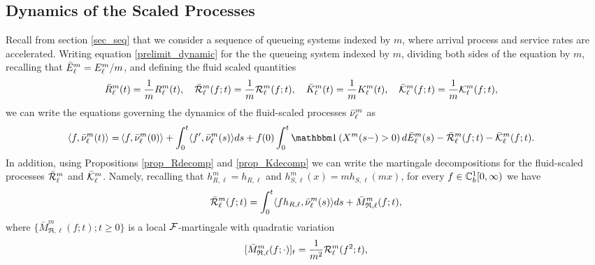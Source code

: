 \documentclass{article}
\theoremstyle{definition}
\numberwithin{equation}{section}
\begin{document}
\subsection{Dynamics of the Scaled Processes}\label{sec_mDynamic}
Recall from section \ref{sec_seq} that we consider a sequence of queueing systems indexed by $m$, where arrival process and service rates are accelerated. Writing equation  \eqref{prelimit_dynamic} for the the queueing system indexed by $m$, dividing both sides of the equation by $m$, recalling that $\bar E_\ell^m =E_\ell^m/m$, and defining the fluid scaled quantities
\begin{equation}\label{def_fluid}
  \bar{R}_\ell^m(t)=\frac{1}{m}R_\ell^m(t),\quad
  \bar{\mathcal{R}}_\ell^m(f;t)=\frac{1}{m}\mathcal{R}_\ell^m(f;t),\quad \bar{K}_\ell^m(t)=\frac{1}{m}K_\ell^m(t),\quad \bar{\mathcal{K}}_\ell^m(f;t)=\frac{1}{m}\mathcal{K}_\ell^m(f;t),\quad
\end{equation}
we can write the equations governing the dynamics of the fluid-scaled processes $\bar{\nu}_\ell^m$ as
\begin{align}\label{prelimit_dynamic_scaled}
  \pairil{f}{\bnu^m_\ell(t)}= & \pair{f}{\bnu^m_\ell(0)}+ \int_{0}^{t}\pairil{f'}{\bnu^m_\ell(s)}ds+   f(0)\int_0^t\indic{X^m(s-)>0}d\barrival^m_{\ell}(s)  -\bar\renegC^m_\ell(f;t)-\bar\entryC^m_\ell(f;t).
\end{align}
In addition, using Propositions \ref{prop_Rdecomp} and \ref{prop_Kdecomp} we can write the martingale decompositions for the fluid-scaled processes $\bar{\mathcal{R}}_\ell^m$ and $\bar{\mathcal{K}}_\ell^m$. Namely, recalling that $h^m_{R,\ell}=h_{R,\ell}$ and $h^m_{S,\ell}(x)=mh_{S,\ell}(mx)$, for every $f\in\mathbb{C}_b^{1}[0,\infty)$ we have
\begin{equation}\label{Rdecomp_scaled}
    \bar{\mathcal{R}}^m_\ell(f;t)= \int_0^t \langle fh_{R,\ell},\bar{\nu}^m_\ell(s)\rangle ds +\bar M^m_{\mathfrak{R},\ell}(f;t),
\end{equation}
where $\{\bar M^m_{\mathfrak{R},\ell}(f;t);t\geq0\}$ is a local $\mathcal{F}$-martingale with quadratic variation
\begin{equation}\label{MR_QV}
  [\bar M^m_{\mathfrak{R},\ell}(f;\cdot)]_t =\frac{1}{m^2}\mathcal{R}^m_\ell(f^2;t),
\end{equation}
\end{document}
